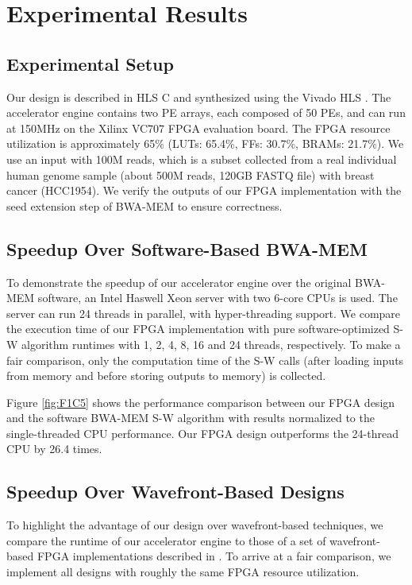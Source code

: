 \section{Experimental Results} 
\label{sec:results}

\subsection{Experimental Setup}

Our design is described in HLS C and synthesized using the Vivado HLS \cite{HLS2011}.
The accelerator engine contains two PE arrays, each composed of 50 PEs, and can run at 150MHz on the Xilinx VC707 FPGA evaluation board.
The FPGA resource utilization is approximately 65\% (LUTs: 65.4\%, FFs: 30.7\%, BRAMs: 21.7\%). 
We use an input with 100M reads, which is a subset collected from a real individual human genome sample (about 500M reads, 120GB FASTQ file) with breast cancer (HCC1954). 
We verify the outputs of our FPGA implementation with the seed extension step of BWA-MEM to ensure correctness. 

\subsection{Speedup Over Software-Based BWA-MEM}

To demonstrate the speedup of our accelerator engine over the original BWA-MEM software, 
an Intel Haswell Xeon server with two 6-core CPUs is used.
The server can run 24 threads in parallel, with hyper-threading support.
We compare the execution time of our FPGA implementation with pure software-optimized S-W algorithm runtimes with 1, 2, 4, 8, 16 and 24 threads, respectively.
To make a fair comparison, only the computation time of the S-W calls (after loading inputs from memory and before storing outputs to memory) is collected.

Figure \ref{fig:F1C5} shows the performance comparison between our FPGA design and the software BWA-MEM S-W algorithm with results normalized to the single-threaded CPU performance.
Our FPGA design outperforms the 24-thread CPU by 26.4 times.

\subsection{Speedup Over Wavefront-Based Designs}

To highlight the advantage of our design over wavefront-based techniques, 
we compare the runtime of our accelerator engine to those of a set of wavefront-based FPGA implementations described in \cite{Zhang2007}. To arrive at a fair comparison, we implement all designs with roughly the same FPGA resource utilization.

